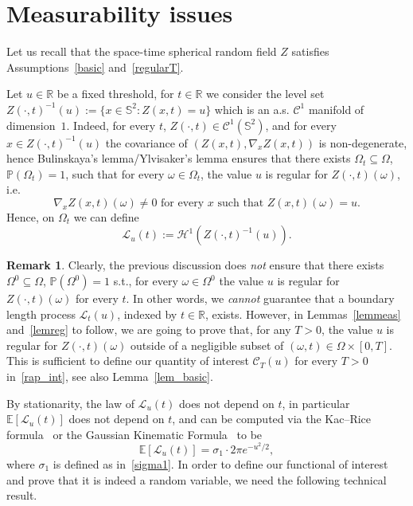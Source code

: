 \documentclass[10pt]{amsart}
\theoremstyle{definition}\newtheorem{defi}[theo]{Definition}\newtheorem{rema}[theo]{Remark}\newtheorem{exam}[theo]{Example}\newtheorem{exem}[theo]{Example}\newtheorem{nota}[theo]{Notation}
\newcommand{\clC}{\mathcal{C}}
\newcommand{\clL}{\mathcal{L}}
\newcommand{\clH}{\mathcal{H}}
\newcommand{\bbS}{\mathbb{S}}
\newcommand{\bbR}{\mathbb{R}}
\newcommand{\bbP}{\mathbb{P}}
\newcommand{\bbE}{\mathbb{E}}
\begin{document}
\section{Measurability issues}

Let us recall that the space-time spherical random field $Z$ satisfies Assumptions~\ref{basic} and~\ref{regularT}.

Let $u\in \bbR$ be a fixed threshold, for $ t\in \bbR$ we consider the level set $Z(\cdot, t)^{-1}(u):=\{ x\in \bbS^2 : Z(x,t) = u\}$ which is an a.s. $\clC^1$ manifold of dimension~$1$. Indeed, for every $t$, $Z(\cdot, t)\in \clC^1(\bbS^2)$, and for every $x\in Z(\cdot, t)^{-1}(u)$ the covariance of $(Z(x,t), \nabla_x Z(x,t))$ is non-degenerate, hence Bulinskaya's lemma/Ylvisaker's lemma ensures that there exists $
\Omega_t\subseteq \Omega$, $\bbP(\Omega_t)=1$, such that for every $
\omega\in \Omega_t$, the value $u$ is regular for $Z(\cdot, t)(\omega)$, i.e.
\begin{equation*}
\nabla_x Z(x, t)(\omega)\ne 0 \text{ for every } x \text{ such that } Z(x,t)(\omega)=u.
\end{equation*}
Hence, on $\Omega_t$ we can define
\begin{equation*}
\clL_u(t):=\clH^1\left(Z(\cdot, t)^{-1}(u)\right).
\end{equation*}
\begin{rema}
Clearly, the previous discussion does \emph{not} ensure that there exists $\Omega^0\subseteq \Omega$, $\bbP(\Omega^0)=1$ s.t., for every $\omega\in \Omega^0$ the value $u$ is regular for $Z(\cdot, t)(\omega)$ for every $t$. In other words, we \emph{cannot} guarantee that a boundary length process $\clL_t(u)$, indexed by $t\in \bbR$, exists. However, in Lemmas~\ref{lemmeas} and~\ref{lemreg} to follow, we are going to prove that, for any $T>0$, the value $u$ is regular for $Z(\cdot, t)(\omega)$ outside of a negligible subset of $(\omega, t)\in \Omega\times [0,T]$. This is sufficient to define our quantity of interest $\clC_T(u)$ for every $T>0$ in~\eqref{rap_int}, see also Lemma~\ref{lem_basic}.
\end{rema}

By stationarity, the law of $\clL_u(t)$ does not depend on $t$, in particular $\bbE[\clL_u(t)]$ does not depend on $t$, and can be computed via the Kac--Rice formula~\cite[Theorem~6.8]{AW:09} or the Gaussian Kinematic Formula~\cite[Theorem~13.2.1]{adlertaylor} to be
\begin{equation*}
\bbE[\clL_u(t)] = \sigma_1 \cdot 2\pi e^{-u^2/2},
\end{equation*}
where $\sigma_1$ is defined as in~\eqref{sigma1}. In order to define our functional of interest and prove that it is indeed a random variable, we need the following technical result.
\end{document}

